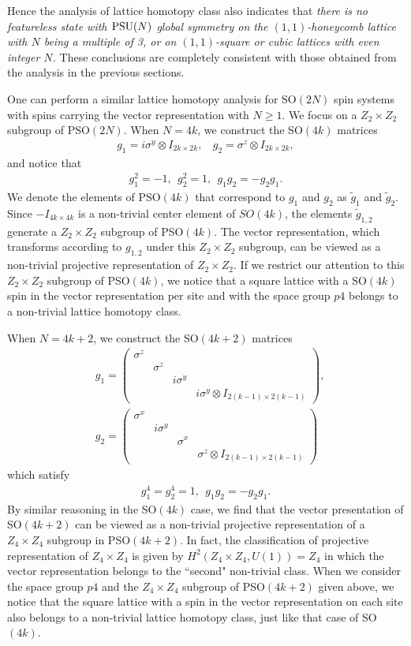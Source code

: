 \documentclass[aps,prb,twocolumn,superscriptaddress,showpacs]{revtex4}
\newcommand{\beqn}{\begin{eqnarray}}
\newcommand{\eeqn}{\end{eqnarray}}
\def\PSU{{\rm PSU}}
\begin{document}
Hence the analysis of lattice homotopy class also indicates that
{\it there is no featureless state with $\PSU(N)$ global symmetry
on the $(1,1)$-honeycomb lattice with $N$ being a multiple of 3,
or on $(1,1)$-square or cubic lattices with even integer $N$.}
These conclusions are completely consistent with those obtained
from the analysis in the previous sections.

One can perform a similar lattice homotopy analysis for SO$(2N)$
spin systems with spins carrying the vector representation with $N
\geq 1$. We focus on a $Z_2 \times Z_2$ subgroup of PSO$(2N)$.
When $N=4k$, we construct the SO$(4k)$ matrices \beqn g_1 = i
\sigma^y \otimes I_{2k \times 2k}, ~~~~ g_2 = \sigma^z \otimes
I_{2k \times 2k}, \eeqn and notice that \beqn g_1^2 = -1,~~ g_2^2
= 1,~~ g_1 g_2 = -g_2 g_1. \eeqn We denote the elements of
PSO$(4k)$ that correspond to $g_1$ and $g_2$ as $\tilde{g}_1$ and
$\tilde{g}_2$. Since $-I_{4k\times 4k}$ is a non-trivial center
element of $SO(4k)$, the elements $\tilde{g}_{1,2}$ generate a
$Z_2 \times Z_2$ subgroup of PSO$(4k)$. The vector representation,
which transforms according to $g_{1,2}$ under this $Z_2 \times
Z_2$ subgroup, can be viewed as a non-trivial projective
representation of $Z_2 \times Z_2$. If we restrict our attention
to this $Z_2 \times Z_2$ subgroup of PSO$(4k)$, we notice that a
square lattice with a SO$(4k)$ spin in the vector representation
per site and with the space group $p4$ belongs to a non-trivial
lattice homotopy class.

When $N=4k+2$, we construct the SO$(4k+2)$ matrices
\beqn
& g_1 =
\left(
\begin{array}{cccc}
\sigma^z & & & \\
& \sigma^z & & \\
& & i\sigma^y &  \\
& & & i\sigma^y \otimes I_{2(k-1) \times 2(k-1)}
\end{array}
\right),
\nonumber \\
& g_2 =
\left(
\begin{array}{cccc}
\sigma^x & & & \\
& i\sigma^y & & \\
& & \sigma^x &  \\
& & & \sigma^z \otimes I_{2(k-1) \times 2(k-1)}
\end{array}
\right) \eeqn which satisfy \beqn g_1^4 = g_2^4 =1,~~ g_1 g_2 =
-g_2 g_1. \eeqn By similar reasoning in the SO$(4k)$ case, we find
that the vector presentation of SO$(4k+2)$ can be viewed as a
non-trivial projective representation of a $Z_4 \times Z_4$
subgroup in PSO$(4k+2)$. In fact, the classification of projective
representation of $Z_4 \times Z_4$ is given by $H^2(Z_4 \times Z_4
, U(1)) = Z_4$ in which the vector representation belongs to the
``second" non-trivial class. When we consider the space group $p4$
and the $Z_4 \times Z_4$ subgroup of PSO$(4k+2)$ given above, we
notice that the square lattice with a spin in the vector
representation on each site also belongs to a non-trivial lattice
homotopy class, just like that case of SO$(4k)$.
\end{document}
